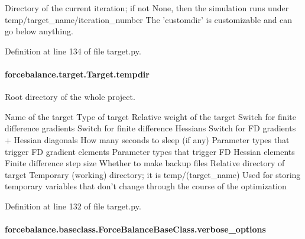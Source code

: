 Directory of the current iteration; if not None, then the simulation runs under temp/target\-\_\-name/iteration\-\_\-number The 'customdir' is customizable and can go below anything.

Definition at line 134 of file target.\-py.

\hypertarget{classforcebalance_1_1target_1_1Target_aa1f01b5b78db253b5b66384ed11ed193}{
\paragraph[{tempdir}]{\setlength{\rightskip}{0pt plus 5cm}forcebalance.\-target.\-Target.\-tempdir\hspace{0.3cm}{\ttfamily [inherited]}}}\label{classforcebalance_1_1target_1_1Target_aa1f01b5b78db253b5b66384ed11ed193}


Root directory of the whole project. 

Name of the target Type of target Relative weight of the target Switch for finite difference gradients Switch for finite difference Hessians Switch for F\-D gradients + Hessian diagonals How many seconds to sleep (if any) Parameter types that trigger F\-D gradient elements Parameter types that trigger F\-D Hessian elements Finite difference step size Whether to make backup files Relative directory of target Temporary (working) directory; it is temp/(target\-\_\-name) Used for storing temporary variables that don't change through the course of the optimization 

Definition at line 132 of file target.\-py.

\hypertarget{classforcebalance_1_1baseclass_1_1ForceBalanceBaseClass_a8088e1e20cbd6bc175fb9c9fe9fa0f18}{
\paragraph[{verbose\-\_\-options}]{\setlength{\rightskip}{0pt plus 5cm}forcebalance.\-baseclass.\-Force\-Balance\-Base\-Class.\-verbose\-\_\-options\hspace{0.3cm}{\ttfamily [inherited]}}}\label{classforcebalance_1_1baseclass_1_1ForceBalanceBaseClass_a8088e1e20cbd6bc175fb9c9fe9fa0f18}


